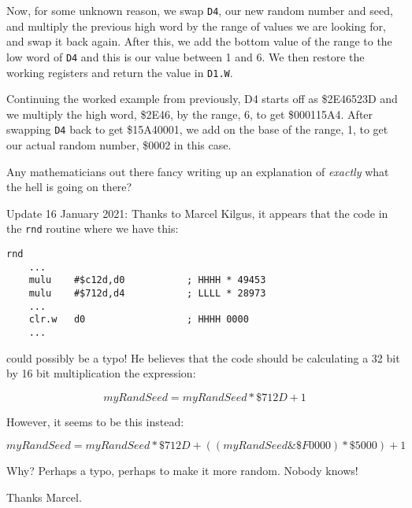 Now, for some unknown reason, we swap \lstinline!D4!, our new random
number and seed, and multiply the previous high word by the range
of values we are looking for, and swap it back again. After this,
we add the bottom value of the range to the low word of \lstinline!D4!
and this is our value between 1 and 6. We then restore the working
registers and return the value in \lstinline!D1.W!.

Continuing the worked example from previously, D4 starts off as \$2E46523D
and we multiply the high word, \$2E46, by the range, 6, to get \$000115A4.
After swapping \lstinline!D4! back to get \$15A40001, we add on the
base of the range, 1, to get our actual random number, \$0002 in this
case.

Any mathematicians out there fancy writing up an explanation of \emph{exactly}
what the hell is going on there?

Update 16 January 2021: Thanks to Marcel Kilgus, it appears that the
code in the \lstinline!rnd! routine where we have this:

\begin{lstlisting}[caption={Rnd 1 to 6 function - Part 1},firstnumber=49]
rnd
    ...
    mulu    #$c12d,d0           ; HHHH * 49453
    mulu    #$712d,d4           ; LLLL * 28973
	...
    clr.w   d0                  ; HHHH 0000
	...
\end{lstlisting}

could possibly be a typo! He believes that the code should be calculating
a 32 bit by 16 bit multiplication \textendash{} the expression:

\[
myRandSeed=myRandSeed*\$712D+1
\]

However, it seems to be this instead:

\[
myRandSeed=myRandSeed*\$712D+\left(\left(myRandSeed\&\$F0000\right)*\$5000\right)+1
\]

Why? Perhaps a typo, perhaps to make it more random. Nobody knows!

Thanks Marcel.
